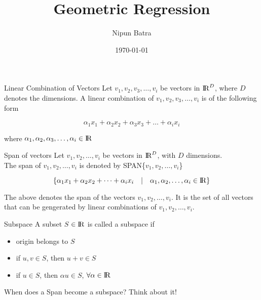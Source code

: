 \documentclass{beamer}
\title{Geometric Regression}
\date{\today}
\author{Nipun Batra}
\institute{IIT Gandhinagar}
\begin{document}
	\maketitle
	
	
	\begin{frame}{Linear Combination of Vectors}
		Let $v_{1},v_{2},v_{3},\dots,v_{i}$ be vectors in  ${\rm I\!R}^{D}$, where $D$ denotes the dimensions. A linear combination of $v_{1},v_{2},v_{3},\dots,v_{i}$ is of the following form
		
		\begin{equation*}
			\alpha_{1}x_{1}+			\alpha_{2}x_{2}+			\alpha_{3}x_{3}+
			\dots+\alpha_{i}x_{i}
		\end{equation*}
		
		where $\alpha_{1},\alpha_{2},\alpha_{3},\dots,\alpha_{i} \in {\rm I\!R}$
		
	\end{frame}

\begin{frame}{Span of vectors}
		Let $v_{1},v_{2},\dots,v_{i}$ be vectors in  ${\rm I\!R}^{D}$, with $D$ dimensions. \\
		The span of  $v_{1},v_{2},\dots,v_{i}$ is denoted by SPAN\{$v_{1},v_{2},\dots,v_{i} $\}
		
		\begin{equation*}
	    \{	\alpha_{1}x_{1}+			\alpha_{2}x_{2}+
		\dots+\alpha_{i}x_{i} \hspace{1em}\vert \hspace{1em}  \alpha_{1},\alpha_{2},\dots,\alpha_{i} \in {\rm I\!R}\}
		\end{equation*}
		
		The above denotes the span of the vectors $v_{1},v_{2},\dots,v_{i}$.  It is the set of all vectors that can be gengerated by linear combinations of $v_{1},v_{2},\dots,v_{i}$.
\end{frame}


\begin{frame}{Subspace}
	A subset $S$ $\in {\rm I\!R}$ is called a subspace if  
	\begin{itemize}
		\item origin belongs to $S$
		\item if $u,v \in S$, then $u+v \in S$  
		\item if $u \in S$, then $\alpha u \in S$,  $\forall \alpha \in {\rm I\!R}$
	\end{itemize}	
\end{frame}

\begin{frame}{When does a Span become a subspace?}
	Think about it!
\end{frame}
\end{document}
